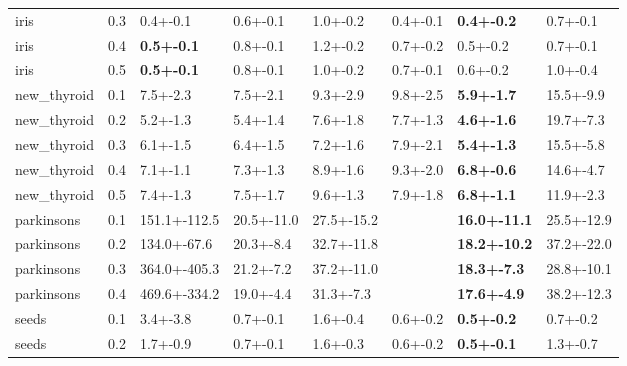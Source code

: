 \begin{tabular}{lrllllll}
         iris &           0.3 &          0.4+-0.1 &               0.6+-0.1 &       1.0+-0.2 &       0.4+-0.1 &       \textbf{0.4+-0.2} &       0.7+-0.1 \\
         iris &           0.4 & \textbf{0.5+-0.1} &               0.8+-0.1 &       1.2+-0.2 &       0.7+-0.2 &                0.5+-0.2 &       0.7+-0.1 \\
         iris &           0.5 & \textbf{0.5+-0.1} &               0.8+-0.1 &       1.0+-0.2 &       0.7+-0.1 &                0.6+-0.2 &       1.0+-0.4 \\
  new_thyroid &           0.1 &          7.5+-2.3 &               7.5+-2.1 &       9.3+-2.9 &       9.8+-2.5 &       \textbf{5.9+-1.7} &      15.5+-9.9 \\
  new_thyroid &           0.2 &          5.2+-1.3 &               5.4+-1.4 &       7.6+-1.8 &       7.7+-1.3 &       \textbf{4.6+-1.6} &      19.7+-7.3 \\
  new_thyroid &           0.3 &          6.1+-1.5 &               6.4+-1.5 &       7.2+-1.6 &       7.9+-2.1 &       \textbf{5.4+-1.3} &      15.5+-5.8 \\
  new_thyroid &           0.4 &          7.1+-1.1 &               7.3+-1.3 &       8.9+-1.6 &       9.3+-2.0 &       \textbf{6.8+-0.6} &      14.6+-4.7 \\
  new_thyroid &           0.5 &          7.4+-1.3 &               7.5+-1.7 &       9.6+-1.3 &       7.9+-1.8 &       \textbf{6.8+-1.1} &      11.9+-2.3 \\
   parkinsons &           0.1 &      151.1+-112.5 &             20.5+-11.0 &     27.5+-15.2 &                &     \textbf{16.0+-11.1} &     25.5+-12.9 \\
   parkinsons &           0.2 &       134.0+-67.6 &              20.3+-8.4 &     32.7+-11.8 &                &     \textbf{18.2+-10.2} &     37.2+-22.0 \\
   parkinsons &           0.3 &      364.0+-405.3 &              21.2+-7.2 &     37.2+-11.0 &                &      \textbf{18.3+-7.3} &     28.8+-10.1 \\
   parkinsons &           0.4 &      469.6+-334.2 &              19.0+-4.4 &      31.3+-7.3 &                &      \textbf{17.6+-4.9} &     38.2+-12.3 \\
        seeds &           0.1 &          3.4+-3.8 &               0.7+-0.1 &       1.6+-0.4 &       0.6+-0.2 &       \textbf{0.5+-0.2} &       0.7+-0.2 \\
        seeds &           0.2 &          1.7+-0.9 &               0.7+-0.1 &       1.6+-0.3 &       0.6+-0.2 &       \textbf{0.5+-0.1} &       1.3+-0.7 \\

\end{tabular}
